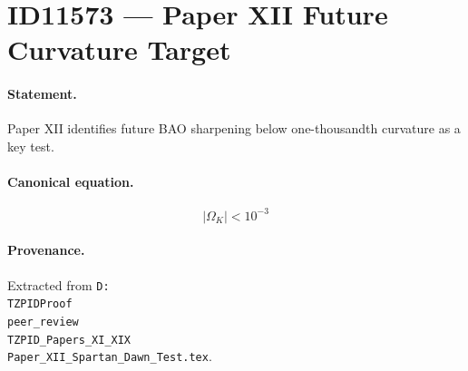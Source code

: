 \section*{ID11573 --- Paper XII Future Curvature Target}

\paragraph{Statement.}
Paper XII identifies future BAO sharpening below one-thousandth curvature as a key test.

\paragraph{Canonical equation.}
\[
|\Omega_K|<10^{-3}
\]

\paragraph{Provenance.}
Extracted from \texttt{D:\\TZPIDProof\\peer\_review\\TZPID\_Papers\_XI\_XIX\\Paper\_XII\_Spartan\_Dawn\_Test.tex}.
